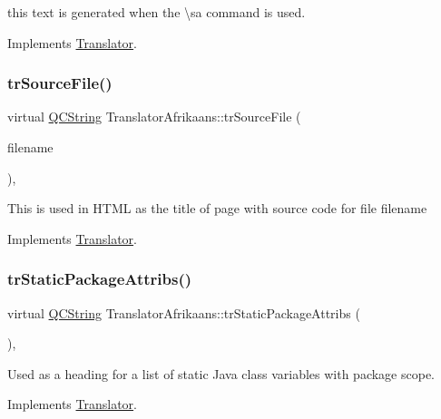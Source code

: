 this text is generated when the \textbackslash{}sa command is used. 

Implements \mbox{\hyperlink{class_translator}{Translator}}.

\mbox{\label{class_translator_afrikaans_a3882e1fdc3477059d82c0f7df9958d69}} 
\subsubsection{\texorpdfstring{trSourceFile()}{trSourceFile()}}
{\footnotesize\ttfamily virtual \mbox{\hyperlink{class_q_c_string}{Q\+C\+String}} Translator\+Afrikaans\+::tr\+Source\+File (\begin{DoxyParamCaption}\item[{\mbox{\hyperlink{class_q_c_string}{Q\+C\+String}} \&}]{filename }\end{DoxyParamCaption})\hspace{0.3cm}{\ttfamily [inline]}, {\ttfamily [virtual]}}

This is used in H\+T\+ML as the title of page with source code for file filename 

Implements \mbox{\hyperlink{class_translator}{Translator}}.

\mbox{\label{class_translator_afrikaans_ae57bdebd2af4ee37d143b835945c9440}} 
\subsubsection{\texorpdfstring{trStaticPackageAttribs()}{trStaticPackageAttribs()}}
{\footnotesize\ttfamily virtual \mbox{\hyperlink{class_q_c_string}{Q\+C\+String}} Translator\+Afrikaans\+::tr\+Static\+Package\+Attribs (\begin{DoxyParamCaption}{ }\end{DoxyParamCaption})\hspace{0.3cm}{\ttfamily [inline]}, {\ttfamily [virtual]}}

Used as a heading for a list of static Java class variables with package scope. 

Implements \mbox{\hyperlink{class_translator}{Translator}}.

